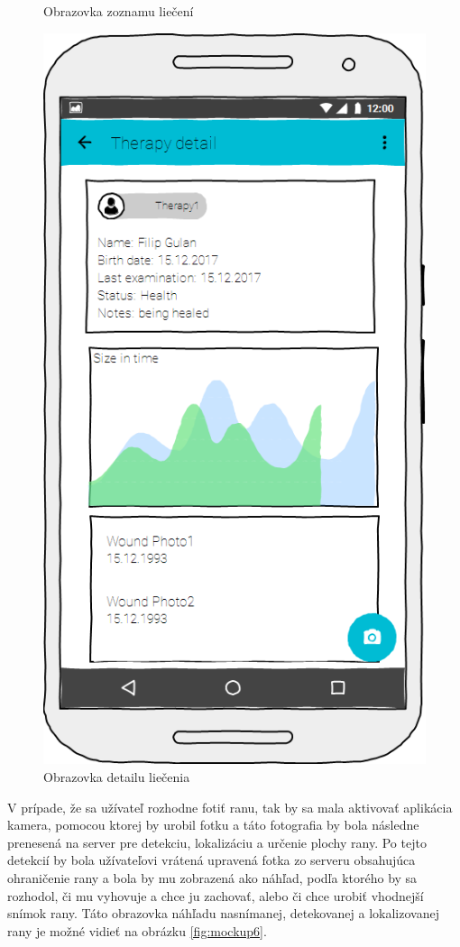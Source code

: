 \begin{figure}[h]
\begin{minipage}{0.48\textwidth}
      \caption{Obrazovka zoznamu liečení}
      \label{fig:mockup4}
   \end{minipage}\hfill
   \begin {minipage}{0.48\textwidth}
     \centering
     \includegraphics[scale=0.45]{fig/mockup5.png}
      \caption{Obrazovka detailu liečenia}
      \label{fig:mockup5}
   \end{minipage}
\end{figure}

V prípade, že sa užívateľ rozhodne fotiť ranu, tak by sa mala aktivovať aplikácia kamera, pomocou ktorej by urobil fotku a táto fotografia by bola následne prenesená na server pre detekciu, lokalizáciu a určenie plochy rany. Po tejto detekcií by bola užívateľovi vrátená upravená fotka zo serveru obsahujúca ohraničenie rany a bola by mu zobrazená ako náhľad, podľa ktorého by sa rozhodol, či mu vyhovuje a chce ju zachovať, alebo či chce urobiť vhodnejší snímok rany. Táto obrazovka náhľadu nasnímanej, detekovanej a lokalizovanej rany je možné vidieť na obrázku \ref{fig:mockup6}. 

